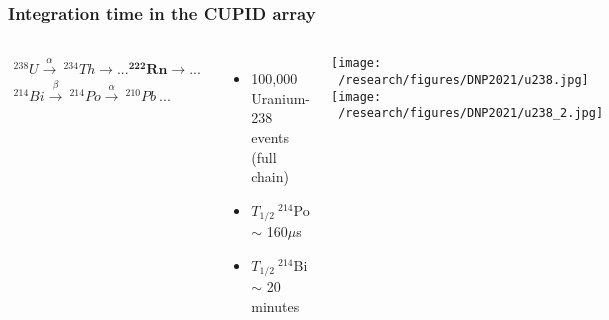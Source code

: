 \documentclass{beamer}
\begin{document}
	\begin{frame}
		\frametitle{Integration time in the CUPID array}
		\begin{columns}[c] %
			
			\begin{eqnarray*}
			^{238}U \xrightarrow{\alpha} \  ^{234}Th \xrightarrow \  ... \boldsymbol{^{222}Rn} \xrightarrow \ ... \\ ^{214}Bi \xrightarrow{\beta} \  ^{214}Po \xrightarrow{\alpha} \ ^{210}Pb \ ...
			\end{eqnarray*}
			\begin{itemize}
				\setlength\itemsep{2em}
				\item 100,000 Uranium-238 events (full chain)
				\item $T_{1/2} \ ^{214}$Po $\sim$ 160$\mu$s
				\item $T_{1/2} \ ^{214}$Bi $\sim$ 20 minutes
			\end{itemize}
			
			\hspace*{0.3cm}\texttt{[image: ~/research/figures/DNP2021/u238.jpg]}
			\medskip\medskip
			\hspace*{0.3cm}\texttt{[image: ~/research/figures/DNP2021/u238\_2.jpg]}
			
		\end{columns}
	\end{frame}

\end{document}
